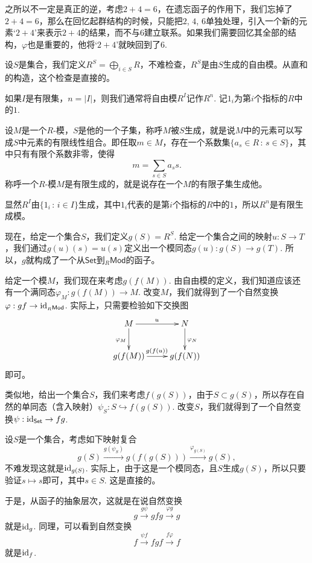 之所以不一定是真正的逆，考虑$2+4=6$，在遗忘函子的作用下，我们忘掉了$2+4=6$，那么在回忆起群结构的时候，只能把$2$, $4$, $6$单独处理，引入一个新的元素`$2+4$'来表示$2+4$的结果，而不与$6$建立联系。如果我们需要回忆其全部的结构，$\varphi$也是重要的，他将`$2+4$'就映回到了$6$.

\begin{para}[自由模的存在性]
设$S$是集合，我们定义$R^S=\bigoplus_{i\in S}R$，不难检查，$R^S$是由$S$生成的自由模。从直和的构造，这个检查是直接的。

如果$I$是有限集，$n=|I|$，则我们通常将自由模$R^I$记作$R^n$. 记$1_i$为第$i$个指标的$R$中的$1$.
\end{para}

\begin{para}
设$M$是一个$R$-模，$S$是他的一个子集，称呼$M$被$S$生成，就是说$M$中的元素可以写成$S$中元素的有限线性组合。即任取$m\in M$，存在一个系数集$\{a_s\in R\,:\, s\in S\}$，其中只有有限个系数非零，使得
\[
	m=\sum_{s\in S}a_s s.
\]
称呼一个$R$-模$M$是有限生成的，就是说存在一个$M$的有限子集生成他。

显然$R^I$由$\{1_i\,:\,i\in I\}$生成，其中$1_i$代表的是第$i$个指标的$R$中的$1$，所以$R^n$是有限生成模。
\end{para}

\begin{para}
现在，给定一个集合$S$，我们定义$g(S)=R^S$. 给定一个集合之间的映射$u:S\to T$，我们通过$g(u)(s)=u(s)$定义出一个模同态$g(u):g(S)\to g(T)$. 所以，$g$就构成了一个从$\mathsf{Set}$到${}_R\mathsf{Mod}$的函子。

给定一个模$M$，我们现在来考虑$g(f(M))$. 由自由模的定义，我们知道应该还有一个满同态$\varphi_M:g(f(M))\to M$. 改变$M$，我们就得到了一个自然变换$\varphi:gf\to \operatorname{id}_{{}_R\mathsf{Mod}}$. 实际上，只需要检验如下交换图
\[
	\xymatrix{
	M\ar[d]_{\varphi_M}\ar[r]^u&N\ar[d]^{\varphi_N}\\
	g(f(M))\ar[r]^{g(f(u))}&g(f(N))\\
	}
\]
即可。

类似地，给出一个集合$S$，我们来考虑$f(g(S))$，由于$S\subset g(S)$，所以存在自然的单同态（含入映射）$\psi_S:S\hookrightarrow f(g(S))$. 改变$S$，我们就得到了一个自然变换$\psi:\operatorname{id}_{\mathsf{Set}}\to fg$.

设$S$是一个集合，考虑如下映射复合
\[
	g(S)\xrightarrow{g(\psi_S)}g(f(g(S)))\xrightarrow{\varphi_{g(S)}}g(S),
\]
不难发现这就是$\operatorname{id}_{g(S)}$. 实际上，由于这是一个模同态，且$S$生成$g(S)$，所以只要验证$s\mapsto s$即可，其中$s\in S$. 这是直接的。

于是，从函子的抽象层次，这就是在说自然变换
\[
	g\xrightarrow{g \psi}gfg\xrightarrow{\varphi g}g
\]
就是$\operatorname{id}_g$. 同理，可以看到自然变换
\[
	f\xrightarrow{\psi f}fgf\xrightarrow{f \varphi}f
\]
就是$\operatorname{id}_f$.
\end{para}

